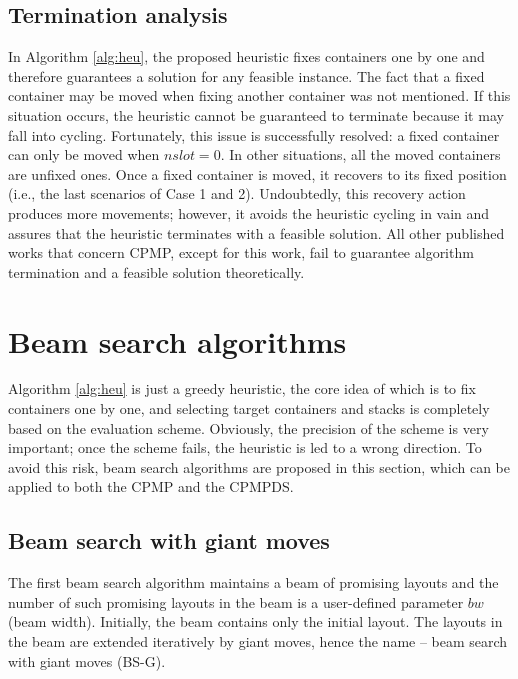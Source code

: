 \documentclass[review,3p,times,authoryear,12pt]{elsarticle}
\begin{document}
\subsection{Termination analysis}

In Algorithm \ref{alg:heu}, the proposed heuristic fixes containers one by one and therefore guarantees a solution for any feasible instance. The fact that a fixed container may be moved when fixing another container was not mentioned.
If this situation occurs, the heuristic cannot be guaranteed to terminate because it may fall into cycling. 
Fortunately, this issue is successfully resolved: a fixed container can only be moved when $\mathit{nslot}=0$.
In other situations, all the moved containers are unfixed ones. Once a fixed container is moved, it recovers to its fixed position (i.e., the last scenarios of Case 1 and 2).
Undoubtedly, this recovery action produces more movements; however, it avoids the heuristic cycling in vain and assures that the heuristic terminates with a feasible solution.
All other published works that concern CPMP, except for this work, fail to guarantee algorithm termination and a feasible solution theoretically.

\section{Beam search algorithms}
\label{sec:g2la}

Algorithm \ref{alg:heu} is just a greedy heuristic, the core idea of which is to fix containers one by one, and selecting target containers and stacks is completely based on the evaluation scheme.
Obviously, the precision of the scheme is very important; once the scheme fails, the heuristic is led to a wrong direction. 
To avoid this risk, beam search algorithms are proposed in this section, which can be applied to both the CPMP and the CPMPDS.

\subsection{Beam search with giant moves}

The first beam search algorithm maintains a beam of promising layouts and the number of such promising layouts in the beam is a user-defined parameter $\mathit{bw}$ (beam width). 
Initially, the beam contains only the initial layout. 
The layouts in the beam are extended iteratively by giant moves, hence the name -- beam search with giant moves (BS-G).
\end{document}
